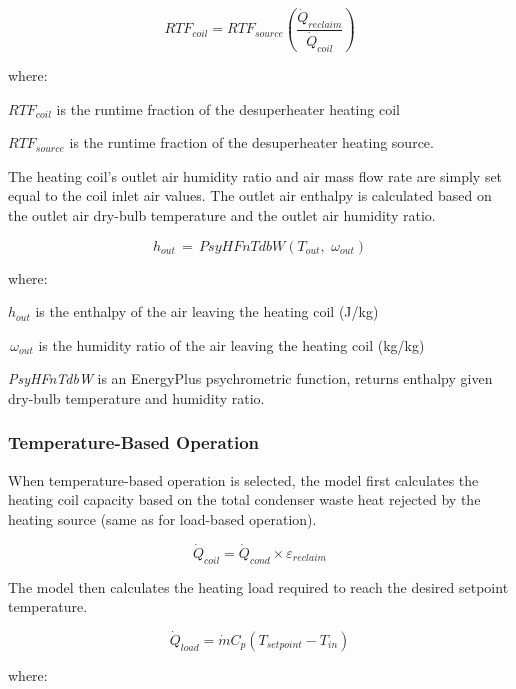 \begin{equation}
RT{F_{coil}} = RT{F_{source}}\left( {\frac{{{{\dot Q}_{reclaim}}}}{{{{\dot Q}_{coil}}}}} \right)
\end{equation}

where:

\(RT{F_{coil}}\) is the runtime fraction of the desuperheater heating coil

\(RT{F_{source}}\) is the runtime fraction of the desuperheater heating source.

The heating coil's outlet air humidity ratio and air mass flow rate are simply set equal to the coil inlet air values. The outlet air enthalpy is calculated based on the outlet air dry-bulb temperature and the outlet air humidity ratio.

\begin{equation}
{h_{out}}\, = \,PsyHFnTdbW({T_{out}},\,\,{\omega_{out}})
\end{equation}

where:

\({h_{out}}\) is the enthalpy of the air leaving the heating coil (J/kg)

\(\,{\omega_{out}}\) is the humidity ratio of the air leaving the heating coil (kg/kg)

\emph{PsyHFnTdbW} is an EnergyPlus psychrometric function, returns enthalpy given dry-bulb temperature and humidity ratio.

\subsubsection{Temperature-Based Operation}\label{temperature-based-operation}

When temperature-based operation is selected, the model first calculates the heating coil capacity based on the total condenser waste heat rejected by the heating source (same as for load-based operation).

\begin{equation}
{\dot Q_{coil}} = {\dot Q_{cond}} \times {\varepsilon_{reclaim}}
\end{equation}

The model then calculates the heating load required to reach the desired setpoint temperature.

\begin{equation}
{\dot Q_{load}} = \dot m{C_p}\left( {{T_{setpoint}} - {T_{in}}} \right)
\end{equation}

where:

